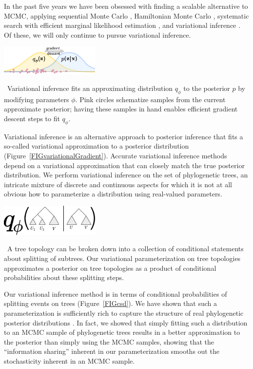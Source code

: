 \documentclass[nobib]{tufte-handout}
\begin{document}
In the past five years we have been obsessed with finding a scalable alternative to MCMC, applying
sequential Monte Carlo \cite{Dinh2017-sh,Fourment2017-an,Claywell2018-zg},
Hamiltonian Monte Carlo \cite{Dinh2017-oj},
systematic search \cite{Whidden2018-db} with efficient marginal likelihood estimation \cite{Fourment2018-xx},
and variational inference \cite{Zhang2018-lw,Zhang2018-mm}.
Of these, we will only continue to pursue variational inference.

\begin{marginfigure}[0.in]%
  \includegraphics[width=1.95in]{variational-gradient}
  \caption{\
    Variational inference fits an approximating distribution $q_\phi$ to the posterior $p$ by modifying parameters $\phi$.
    Pink circles schematize samples from the current approximate posterior; having these samples in hand enables efficient gradient descent steps to fit $q_\phi$.
    }
  \label{FIGvariationalGradient}
\end{marginfigure}%

Variational inference is an alternative approach to posterior inference that fits a so-called variational approximation to a posterior distribution (Figure~\ref{FIGvariationalGradient}).
Accurate variational inference methods depend on a variational approximation that can closely match the true posterior distribution.
We perform variational inference on the set of phylogenetic trees, an intricate mixture of discrete and continuous aspects for which it is not at all obvious how to parameterize a distribution using real-valued parameters.

\begin{marginfigure}[0.7in]%
  \includegraphics[width=1.95in]{csd}
  \caption{\
    A tree topology can be broken down into a collection of conditional statements about splitting of subtrees.
    Our variational parameterization on tree topologies approximates a posterior on tree topologies as a product of conditional probabilities about these splitting steps.
    }
  \label{FIGcsd}
\end{marginfigure}%

Our variational inference method is in terms of conditional probabilities of splitting events on trees (Figure~\ref{FIGcsd}).
We have shown that such a parameterization is sufficiently rich to capture the structure of real phylogenetic posterior distributions \cite{Zhang2018-mm}.
In fact, we showed that simply fitting such a distribution to an MCMC sample of phylogenetic trees results in a better approximation to the posterior than simply using the MCMC samples, showing that the ``information sharing'' inherent in our parameterization smooths out the stochasticity inherent in an MCMC sample.
\end{document}
